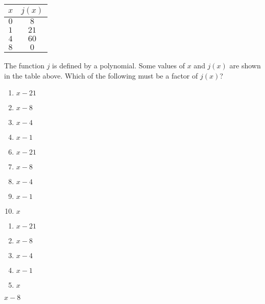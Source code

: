  
\begin{center}\begin{tabular}{c|c}
$x$ & $j(x)$\\\hline \hline 
$0$ & $8$\\
$1$ & $21$\\
$4$ & $60$\\
$8$ & $0$ 
\end{tabular}\end{center}
The function $j$ is defined by a polynomial.  Some values of $x$ and $j(x)$ are shown in the table above.  Which of the following must be a factor of $j(x)$?


\ifsat
	\begin{enumerate}[label=\Alph*)]
		\item $x-21 $ 
		\item $x-8 $ %
		\item $x-4 $ 
		\item $x-1 $
	\end{enumerate}
\else
\fi

\ifacteven
	\begin{enumerate}[label=\textbf{\Alph*.},itemsep=\fill,align=left]
		\setcounter{enumii}{5}
		\item $x-21 $ 
		\item $x-8 $ %
		\item $x-4 $ 
		\addtocounter{enumii}{1}
		\item $x-1 $
		\item $x$
	\end{enumerate}
\else
\fi

\ifactodd
	\begin{enumerate}[label=\textbf{\Alph*.},itemsep=\fill,align=left]
		\item $x-21 $ 
		\item $x-8 $ %
		\item $x-4 $ 
		\item $x-1 $
		\item $x$
	\end{enumerate}
\else
\fi

\ifgridin
 $x-8 $ %
		
\else
\fi


